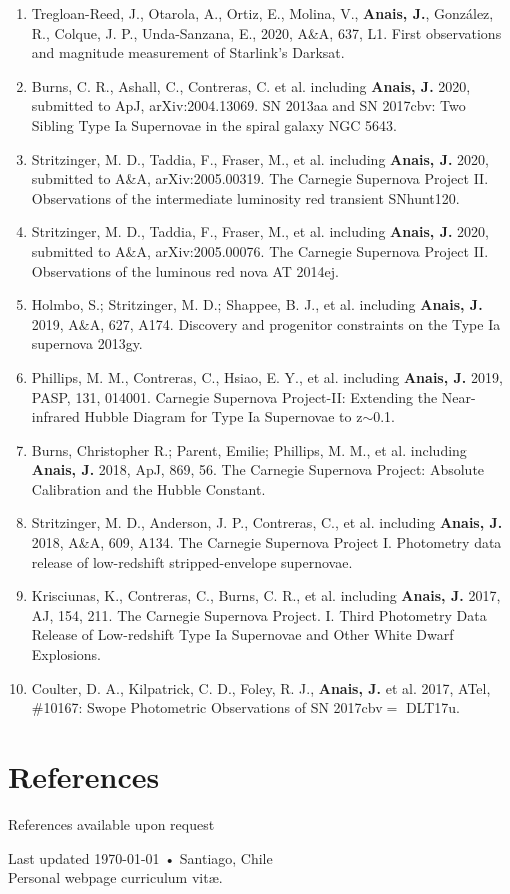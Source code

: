 \documentclass[11pt, a4paper]{article}
\begin{document}
\begin{enumerate}
  \item Tregloan-Reed, J., Otarola, A., Ortiz, E., Molina, V., \textbf{Anais, J.}, González, R., Colque, J. P., Unda-Sanzana, E., 2020, A\&A, 637, L1. First observations and magnitude measurement of Starlink's Darksat.
  \item Burns, C. R., Ashall, C., Contreras, C.  et al. including \textbf{Anais, J.} 2020, submitted to ApJ, arXiv:2004.13069. SN 2013aa and SN 2017cbv: Two Sibling Type Ia Supernovae in the spiral galaxy NGC 5643.
  \item Stritzinger, M. D., Taddia, F., Fraser, M., et al. including \textbf{Anais, J.} 2020, submitted to A\&A, arXiv:2005.00319.  The Carnegie Supernova Project II. Observations of the intermediate luminosity red transient SNhunt120.
  \item Stritzinger, M. D., Taddia, F., Fraser, M., et al. including \textbf{Anais, J.} 2020, submitted to A\&A, arXiv:2005.00076. The Carnegie Supernova Project II. Observations of the luminous red nova AT 2014ej.
  \item Holmbo, S.; Stritzinger, M. D.; Shappee, B. J., et al. including \textbf{Anais, J.} 2019, A\&A, 627, A174. Discovery and progenitor constraints on the Type Ia supernova 2013gy.
  \item Phillips, M. M., Contreras, C., Hsiao, E. Y., et al. including \textbf{Anais, J.} 2019, PASP, 131, 014001. Carnegie Supernova Project-II: Extending the Near-infrared Hubble Diagram for Type Ia Supernovae to z$\sim$0.1.
  \item Burns, Christopher R.; Parent, Emilie; Phillips, M. M., et al. including \textbf{Anais, J.} 2018, ApJ, 869, 56. The Carnegie Supernova Project: Absolute Calibration and the Hubble Constant.
  \item Stritzinger, M. D., Anderson, J. P., Contreras, C., et al. including \textbf{Anais, J.} 2018, A\&A, 609, A134. The Carnegie Supernova Project I. Photometry data release of low-redshift stripped-envelope supernovae.
  \item Krisciunas, K., Contreras, C., Burns, C. R., et al. including \textbf{Anais, J.} 2017, AJ, 154, 211. The Carnegie Supernova Project. I. Third Photometry Data Release of Low-redshift Type Ia Supernovae and Other White Dwarf Explosions.
  \item Coulter, D. A., Kilpatrick, C. D., Foley, R. J., \textbf{Anais, J.} et al. 2017, ATel, \#10167: Swope Photometric Observations of SN 2017cbv$=$ DLT17u.
\end{enumerate}

\section*{References}
References available upon request

\vspace{1cm}
\begin{center}
{\small Last updated \today\- •\- Santiago, Chile}\\
{\scriptsize  Personal webpage curriculum vit\ae.}
\end{center}
\end{document}
